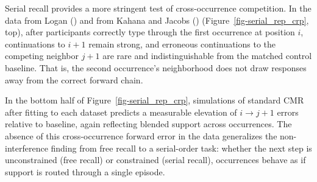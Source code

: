 \documentclass[
  man,
  floatsintext,
  longtable,
  nolmodern,
  notxfonts,
  notimes,
  draftfirst,
  colorlinks=true,linkcolor=blue,citecolor=blue,urlcolor=blue]{apa7}
\begin{document}
Serial recall provides a more stringent test of cross-occurrence
competition. In the data from Logan
() and from Kahana and Jacobs
()
(Figure~\ref{fig-serial_rep_crp}, top), after participants correctly
type through the first occurrence at position \(i\), continuations to
\(i{+}1\) remain strong, and erroneous continuations to the competing
neighbor \(j{+}1\) are rare and indistinguishable from the matched
control baseline. That is, the second occurrence's neighborhood does not
draw responses away from the correct forward chain.

In the bottom half of Figure~\ref{fig-serial_rep_crp}, simulations of
standard CMR after fitting to each dataset predicts a measurable
elevation of \(i\!\rightarrow\!j{+}1\) errors relative to baseline,
again reflecting blended support across occurrences. The absence of this
cross-occurrence forward error in the data generalizes the
non-interference finding from free recall to a serial-order task:
whether the next step is unconstrained (free recall) or constrained
(serial recall), occurrences behave as if support is routed through a
single episode.
\end{document}
